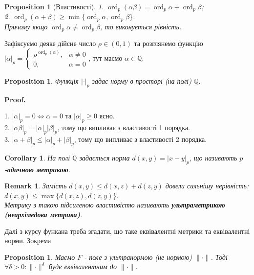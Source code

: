 \documentclass[a4paper, 10pt]{article}
\makeatletter
\theoremstyle{theoremdd}
\theoremstyle{theoremdd}
\theoremstyle{theoremdd}
\theoremstyle{theoremdd}
\theoremstyle{theoremdd}
\newtheorem{proposition}[theorem]{Proposition}
\theoremstyle{theoremdd}
\newtheorem{remark}[theorem]{Remark}
\theoremstyle{theoremdd}
\theoremstyle{theoremdd}
\newtheorem{corollary}[theorem]{Corollary}
\renewenvironment{proof}[1][Proof.\\]{\par
\pushQED{\hfill \qed}%
\normalfont \topsep6\p@\@plus6\p@\relax
\trivlist
\item\relax
{\bfseries
#1\@addpunct{.}}\hspace\labelsep\ignorespaces
}{%
\popQED\endtrivlist\@endpefalse
}
\DeclareMathOperator{\ord}{ord}
\makeatother
\begin{document}
\begin{proposition}[Властивості]
1. $\ord_p (\alpha \beta) = \ord_p \alpha + \ord_p \beta$;\\
2. $\ord_p(\alpha+\beta) \geq \min \{\ord_p \alpha, \ord_p \beta\}$.\\
Причому якщо $\ord_p \alpha \neq \ord_p \beta$, то виконується рівність.
\end{proposition}

Зафіксуємо деяке дійсне число $\rho \in (0,1)$ та розглянемо функцію $|\alpha|_p = \begin{cases} \rho^{\ord_p(\alpha)} , & \alpha \neq 0 \\
0, & \alpha = 0 \end{cases}$, тут маємо $\alpha \in \mathbb{Q}$.

\begin{proposition}
Функція $|\cdot|_p$ задає норму в просторі (на полі) $\mathbb{Q}$.
\end{proposition}

\begin{proof}
1. $|\alpha|_p = 0 \iff \alpha = 0$ та $|\alpha|_p \geq 0$ ясно.\\
2. $|\alpha \beta|_p = |\alpha|_p |\beta|_p$, тому що випливає з властивості 1 порядка.\\
3. $|\alpha+\beta|_p \leq |\alpha|_p + |\beta|_p$, тому що випливає з властивості 2 порядка.
\end{proof}

\begin{corollary}
На полі $\mathbb{Q}$ задається норма $d(x,y) = |x-y|_p$, що називають \textbf{$p$-адичною метрикою}.
\end{corollary}

\begin{remark}
Замість $d(x,y) \leq d(x,z) + d(z,y)$ довели сильнішу нерівність:\\
$d(x,y) \leq \max \{ d(x,z), d(z,y)\}$.\\
Метрику з такою підсиленою властивістю називають \textbf{ультраметрикою (неархімедова метрика)}.
\end{remark}

Далі з курсу функана треба згадати, що таке еквівалентні метрики та еквівалентні норми. Зокрема

\begin{proposition}
Маємо $F$ - поле з ультранормою (не нормою) $\lVert \cdot \rVert$. Тоді $\forall \delta > 0: \lVert \cdot \rVert^\delta$ буде еквівалентним до $\lVert \cdot \rVert$.
\end{proposition}
\end{document}
